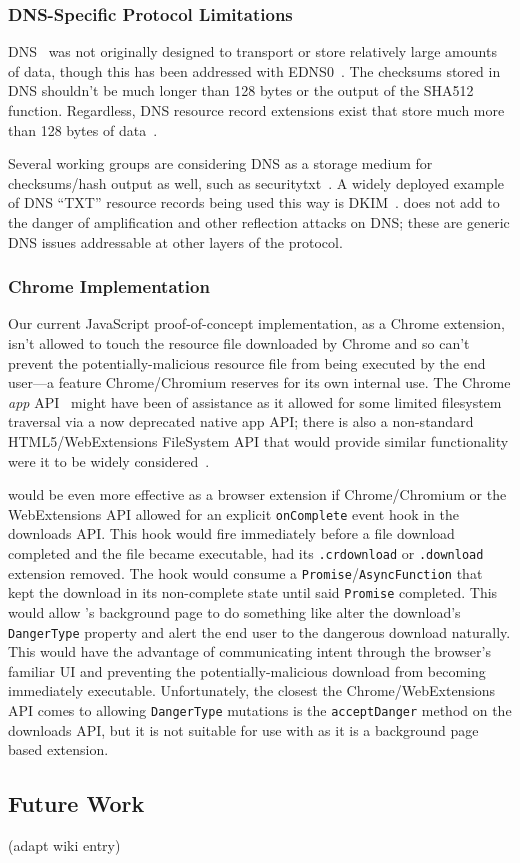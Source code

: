 \subsubsection{DNS-Specific Protocol Limitations}

DNS~\cite{DNS1} was not originally designed to transport or store relatively
large amounts of data, though this has been addressed with EDNS0~\cite{EDNS}.
The checksums stored in DNS shouldn't be much longer than 128 bytes or the
output of the SHA512 function. Regardless, DNS resource record extensions exist
that store much more than 128 bytes of data~\cite{CERT, IPSECKEY, DANE3, DANE1}.

Several working groups are considering DNS as a storage medium for
checksums/hash output as well, such as securitytxt~\cite{draft-sectxt}. A widely
deployed example of DNS ``TXT'' resource records being used this way is
DKIM~\cite{DKIM}. \SYSTEM{} does not add to the danger of amplification and
other reflection attacks on DNS; these are generic DNS issues addressable at
other layers of the protocol.

\subsubsection{Chrome Implementation}

Our current JavaScript proof-of-concept implementation, as a Chrome extension,
isn't allowed to touch the resource file downloaded by Chrome and so can't
prevent the potentially-malicious resource file from being executed by the end
user—a feature Chrome/Chromium reserves for its own internal use. The Chrome
\textit{app} API~\cite{AppAPI} might have been of assistance as it allowed for
some limited filesystem traversal via a now deprecated native app API; there is
also a non-standard HTML5/WebExtensions FileSystem API that would provide
similar functionality were it to be widely considered~\cite{deadSpec}.

\SYSTEM{} would be even more effective as a browser extension if Chrome/Chromium
or the WebExtensions API allowed for an explicit \texttt{onComplete} event hook
in the downloads API. This hook would fire immediately before a file download
completed and the file became executable, \ie had its \texttt{.crdownload} or
\texttt{.download} extension removed. The hook would consume a
\texttt{Promise}/\texttt{AsyncFunction} that kept the download in its
non-complete state until said \texttt{Promise} completed. This would allow
\SYSTEM{}'s background page to do something like alter the download's
\texttt{DangerType} property and alert the end user to the dangerous download
naturally. This would have the advantage of communicating intent through the
browser's familiar UI and preventing the potentially-malicious download from
becoming immediately executable. Unfortunately, the closest the
Chrome/WebExtensions API comes to allowing \texttt{DangerType} mutations is the
\texttt{acceptDanger} method on the downloads API, but it is not suitable for
use with \SYSTEM{} as it is a background page based extension.

\subsection{Future Work}

(adapt wiki entry)
